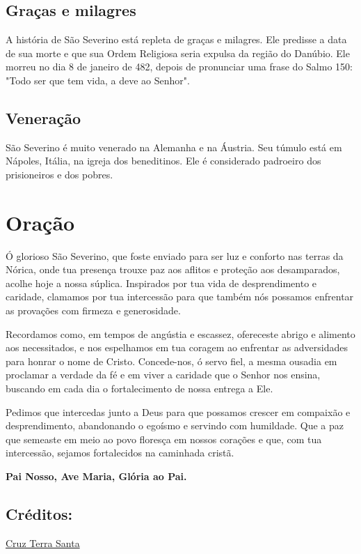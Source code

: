 \documentclass[18pt]{article}
\begin{document}
\begin{justify}
\subsection{Graças e milagres}
A história de São Severino está repleta de graças e milagres. Ele predisse a data de sua morte e que sua Ordem Religiosa seria expulsa da região do Danúbio. Ele morreu no dia 8 de janeiro de 482, depois de pronunciar uma frase do Salmo 150: "Todo ser que tem vida, a deve ao Senhor".

\subsection{Veneração}
São Severino é muito venerado na Alemanha e na Áustria. Seu túmulo está em Nápoles, Itália, na igreja dos beneditinos. Ele é considerado padroeiro dos prisioneiros e dos pobres.


\end{justify}


\section{Oração}\label{sec:Oração} %

Ó glorioso São Severino, que foste enviado para ser luz e conforto nas terras da Nórica, onde tua presença trouxe paz aos aflitos e proteção aos desamparados, acolhe hoje a nossa súplica. Inspirados por tua vida de desprendimento e caridade, clamamos por tua intercessão para que também nós possamos enfrentar as provações com firmeza e generosidade.

Recordamos como, em tempos de angústia e escassez, ofereceste abrigo e alimento aos necessitados, e nos espelhamos em tua coragem ao enfrentar as adversidades para honrar o nome de Cristo. Concede-nos, ó servo fiel, a mesma ousadia em proclamar a verdade da fé e em viver a caridade que o Senhor nos ensina, buscando em cada dia o fortalecimento de nossa entrega a Ele.

Pedimos que intercedas junto a Deus para que possamos crescer em compaixão e desprendimento, abandonando o egoísmo e servindo com humildade. Que a paz que semeaste em meio ao povo floresça em nossos corações e que, com tua intercessão, sejamos fortalecidos na caminhada cristã.

\textbf{Pai Nosso, Ave Maria, Glória ao Pai.}

\subsection*{Créditos:}
\href{https://cruzterrasanta.com.br/historia-de-sao-severino/335/102/}{Cruz Terra Santa}
\end{document}
